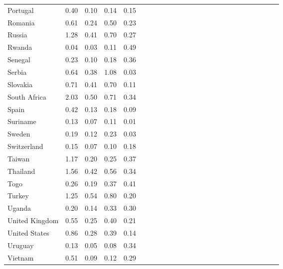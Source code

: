 \begin{ThreePartTable}
\begin{longtable}[t]{l|r|rrrl|r|rrrl|r|rrrl|r|rrrl|r|rrr}
Portugal & 0.40 & 0.10 & 0.14 & 0.15\\
Romania & 0.61 & 0.24 & 0.50 & 0.23\\
Russia & 1.28 & 0.41 & 0.70 & 0.27\\
Rwanda & 0.04 & 0.03 & 0.11 & 0.49\\
Senegal & 0.23 & 0.10 & 0.18 & 0.36\\
Serbia & 0.64 & 0.38 & 1.08 & 0.03\\
Slovakia & 0.71 & 0.41 & 0.70 & 0.11\\
South Africa & 2.03 & 0.50 & 0.71 & 0.34\\
Spain & 0.42 & 0.13 & 0.18 & 0.09\\
Suriname & 0.13 & 0.07 & 0.11 & 0.01\\
Sweden & 0.19 & 0.12 & 0.23 & 0.03\\
Switzerland & 0.15 & 0.07 & 0.10 & 0.18\\
Taiwan & 1.17 & 0.20 & 0.25 & 0.37\\
Thailand & 1.56 & 0.42 & 0.56 & 0.34\\
Togo & 0.26 & 0.19 & 0.37 & 0.41\\
Turkey & 1.25 & 0.54 & 0.80 & 0.20\\
Uganda & 0.20 & 0.14 & 0.33 & 0.30\\
United Kingdom & 0.55 & 0.25 & 0.40 & 0.21\\
United States & 0.86 & 0.28 & 0.39 & 0.14\\
Uruguay & 0.13 & 0.05 & 0.08 & 0.34\\
Vietnam & 0.51 & 0.09 & 0.12 & 0.29\\*
\end{longtable}
\end{ThreePartTable}
\endgroup{}
